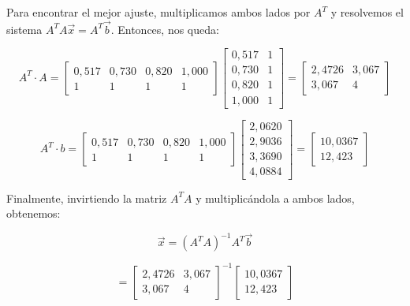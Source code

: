 Para encontrar el mejor ajuste, multiplicamos ambos lados por $A^T$ y resolvemos el sistema $A^T A \vec{x} = A^T \vec{b}$.
Entonces, nos queda:

\begin{equation}
    A^T \cdot A =
    \begin{bmatrix}
        0{,}517 & 0{,}730 & 0{,}820 & 1{,}000 \\
        1       & 1       & 1       & 1
    \end{bmatrix}
    \begin{bmatrix}
        0{,}517 & 1 \\
        0{,}730 & 1 \\
        0{,}820 & 1 \\
        1{,}000 & 1
    \end{bmatrix}
    =
    \begin{bmatrix}
        2{,}4726 & 3{,}067 \\
        3{,}067 & 4
    \end{bmatrix}
    \label{eq:cuadrados-minimos-ATA}
\end{equation}

\begin{equation}
    A^T \cdot b =
    \begin{bmatrix}
        0{,}517 & 0{,}730 & 0{,}820 & 1{,}000 \\
        1       & 1       & 1       & 1
    \end{bmatrix}
    \begin{bmatrix}
        2{,}0620 \\
        2{,}9036 \\
        3{,}3690 \\
        4{,}0884
    \end{bmatrix}
    =
    \begin{bmatrix}
        10{,}0367 \\
        12{,}423
    \end{bmatrix}
    \label{eq:cuadrados-minimos-ATb}
\end{equation}

Finalmente, invirtiendo la matriz $A^T A$ y multiplicándola a ambos lados, obtenemos:

\begin{equation}
    \vec{x} = (A^T A)^{-1} A^T \vec{b}
    \label{eq:cuadrados-minimos-solucion-1}
\end{equation}

\begin{equation}
    =
    \begin{bmatrix}
        2{,}4726 & 3{,}067 \\
        3{,}067 & 4
    \end{bmatrix}
    ^{-1}
    \begin{bmatrix}
        10{,}0367 \\
        12{,}423
    \end{bmatrix}
    \label{eq:cuadrados-minimos-solucion-2}
\end{equation}

